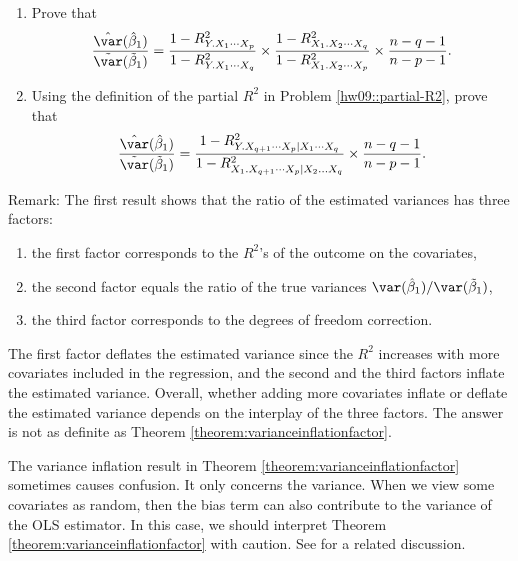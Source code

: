 \begin{enumerate}
\item
Prove that
$$
\frac{\hat \var( \hat{\beta}_1 )}{  \tilde \var( \tilde{\beta}_1 ) }
=   \frac{   1 - R^2_{Y.X_1\cdots X_p}  }{  1 - R^2_{Y.X_1\cdots X_q}  } \times  \frac{  1- R^2_{X_1.X_2\cdots X_q}  }{  1- R^2_{X_1.X_2\cdots X_p}   }  \times \frac{n-q - 1}{n-p - 1}    . 
$$


\item
Using the definition of the partial $R^2$ in Problem \ref{hw09::partial-R2}, prove that
$$
\frac{\hat \var( \hat{\beta}_1 )}{  \tilde \var( \tilde{\beta}_1 ) }
=    \frac{   1 - R^2_{Y.X_{q+1} \cdots X_p  \mid  X_1\cdots X_q}  }{  1 - R^2_{ X_1.X_{q+1}\cdots X_p \mid  X_2\ldots X_q}  }  
\times  \frac{n-q - 1}{n-p - 1} .
$$
\end{enumerate}









Remark: The first result shows that the ratio of the estimated variances has three factors: 
\begin{enumerate}[label=(F\arabic*), ref=F\arabic*]
\item
the first factor corresponds to the $R^2$'s of the outcome on the covariates,
\item
the second factor equals the ratio of the true variances $\var( \hat{\beta}_1 )  /   \var( \tilde{\beta}_1 )$,
\item
the third factor corresponds to the degrees of freedom correction.
\end{enumerate}
The first factor deflates the estimated variance since the $R^2$ increases with more covariates included in the regression, and the second and the third factors inflate the estimated variance. Overall, whether adding more covariates inflate or deflate the estimated variance depends on the interplay of the three factors. The answer is not as definite as Theorem \ref{theorem:varianceinflationfactor}. 


The variance inflation result in Theorem \ref{theorem:varianceinflationfactor} sometimes causes confusion. It only concerns the variance. When we view some covariates as random, then the bias term can also contribute to the variance of the OLS estimator. In this case, we should interpret Theorem \ref{theorem:varianceinflationfactor} with caution. See \citet{ding2019two} for a related discussion. 


